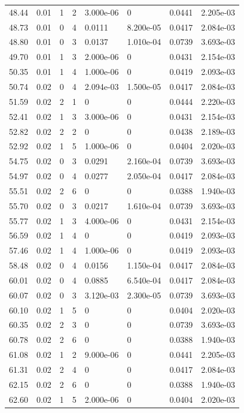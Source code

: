 \documentclass[preview]{standalone}
\begin{document}
{{{\begin{tabular}{L{1.2cm}C{1.2cm} C{0.3cm}C{0.5cm} C{1.4cm}C{1.4cm} C{1.4cm}C{1.4cm}}
  48.44  &  0.01  & 1     &  2 &  3.000e-06  & 0  & 0.0441 &  2.205e-03   \\ 
  48.73  &  0.01  & 0     &  4 &  0.0111  & 8.200e-05  & 0.0417 &  2.084e-03   \\ 
  48.80  &  0.01  & 0     &  3 &  0.0137  & 1.010e-04  & 0.0739 &  3.693e-03   \\ 
  49.70  &  0.01  & 1     &  3 &  2.000e-06  & 0  & 0.0431 &  2.154e-03   \\ 
  50.35  &  0.01  & 1     &  4 &  1.000e-06  & 0  & 0.0419 &  2.093e-03   \\ 
  50.74  &  0.02  & 0     &  4 &  2.094e-03  & 1.500e-05  & 0.0417 &  2.084e-03   \\ 
  51.59  &  0.02  & 2     &  1 &  0  & 0  & 0.0444 &  2.220e-03   \\ 
  52.41  &  0.02  & 1     &  3 &  3.000e-06  & 0  & 0.0431 &  2.154e-03   \\ 
  52.82  &  0.02  & 2     &  2 &  0  & 0  & 0.0438 &  2.189e-03   \\ 
  52.92  &  0.02  & 1     &  5 &  1.000e-06  & 0  & 0.0404 &  2.020e-03   \\ 
  54.75  &  0.02  & 0     &  3 &  0.0291  & 2.160e-04  & 0.0739 &  3.693e-03   \\ 
  54.97  &  0.02  & 0     &  4 &  0.0277  & 2.050e-04  & 0.0417 &  2.084e-03   \\ 
  55.51  &  0.02  & 2     &  6 &  0  & 0  & 0.0388 &  1.940e-03   \\ 
  55.70  &  0.02  & 0     &  3 &  0.0217  & 1.610e-04  & 0.0739 &  3.693e-03   \\ 
  55.77  &  0.02  & 1     &  3 &  4.000e-06  & 0  & 0.0431 &  2.154e-03   \\ 
  56.59  &  0.02  & 1     &  4 &  0  & 0  & 0.0419 &  2.093e-03   \\ 
  57.46  &  0.02  & 1     &  4 &  1.000e-06  & 0  & 0.0419 &  2.093e-03   \\ 
  58.48  &  0.02  & 0     &  4 &  0.0156  & 1.150e-04  & 0.0417 &  2.084e-03   \\ 
  60.01  &  0.02  & 0     &  4 &  0.0885  & 6.540e-04  & 0.0417 &  2.084e-03   \\ 
  60.07  &  0.02  & 0     &  3 &  3.120e-03  & 2.300e-05  & 0.0739 &  3.693e-03   \\ 
  60.10  &  0.02  & 1     &  5 &  0  & 0  & 0.0404 &  2.020e-03   \\ 
  60.35  &  0.02  & 2     &  3 &  0  & 0  & 0.0739 &  3.693e-03   \\ 
  60.78  &  0.02  & 2     &  6 &  0  & 0  & 0.0388 &  1.940e-03   \\ 
  61.08  &  0.02  & 1     &  2 &  9.000e-06  & 0  & 0.0441 &  2.205e-03   \\ 
  61.31  &  0.02  & 2     &  4 &  0  & 0  & 0.0417 &  2.084e-03   \\ 
  62.15  &  0.02  & 2     &  6 &  0  & 0  & 0.0388 &  1.940e-03   \\ 
  62.60  &  0.02  & 1     &  5 &  2.000e-06  & 0  & 0.0404 &  2.020e-03   \\ 
\hline 
\end{tabular} 

}}}
\end{document}
